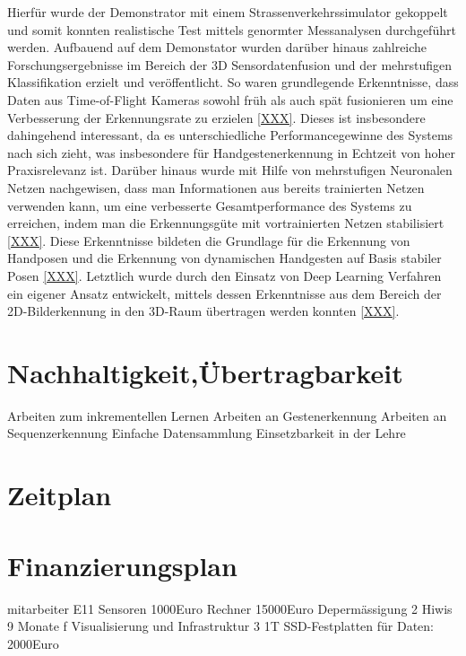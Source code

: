 \documentclass{article}
\begin{document}
Hierfür wurde der Demonstrator mit einem Strassenverkehrssimulator gekoppelt und somit konnten realistische Test mittels genormter Messanalysen durchgeführt werden. Aufbauend auf dem Demonstator wurden darüber hinaus zahlreiche Forschungsergebnisse im Bereich der 3D Sensordatenfusion und der mehrstufigen Klassifikation erzielt und veröffentlicht. So waren grundlegende Erkenntnisse, dass Daten aus Time-of-Flight Kameras sowohl früh als auch spät fusionieren um eine Verbesserung der Erkennungsrate zu erzielen \ref{XXX}. Dieses ist insbesondere dahingehend interessant, da es unterschiedliche Performancegewinne des Systems nach sich zieht, was insbesondere für Handgestenerkennung in Echtzeit von hoher Praxisrelevanz ist. Darüber hinaus wurde mit Hilfe von mehrstufigen Neuronalen Netzen nachgewisen, dass man Informationen aus bereits trainierten Netzen verwenden kann, um eine verbesserte Gesamtperformance des Systems zu erreichen, indem man die Erkennungsgüte mit vortrainierten Netzen stabilisiert \ref{XXX}. Diese Erkenntnisse bildeten die Grundlage für die Erkennung von Handposen und die Erkennung von dynamischen Handgesten auf Basis stabiler Posen \ref{XXX}. Letztlich wurde durch den Einsatz von Deep Learning Verfahren ein eigener Ansatz entwickelt, mittels dessen Erkenntnisse aus dem Bereich der 2D-Bilderkennung in den 3D-Raum übertragen werden konnten \ref{XXX}.  

\renewcommand{\thesection}{6}
\section{Nachhaltigkeit,Übertragbarkeit}
Arbeiten zum inkrementellen Lernen
Arbeiten an Gestenerkennung
Arbeiten an Sequenzerkennung
Einfache Datensammlung
Einsetzbarkeit in der Lehre

\renewcommand{\thesection}{7}
\section{Zeitplan}

\renewcommand{\thesection}{8}
\section{Finanzierungsplan}
mitarbeiter E11
Sensoren 1000Euro
Rechner 15000Euro
Depermässigung
2 Hiwis 9 Monate f Visualisierung und Infrastruktur
3 1T SSD-Festplatten für Daten: 2000Euro


\renewcommand{\refname}{}


%
\end{document}
